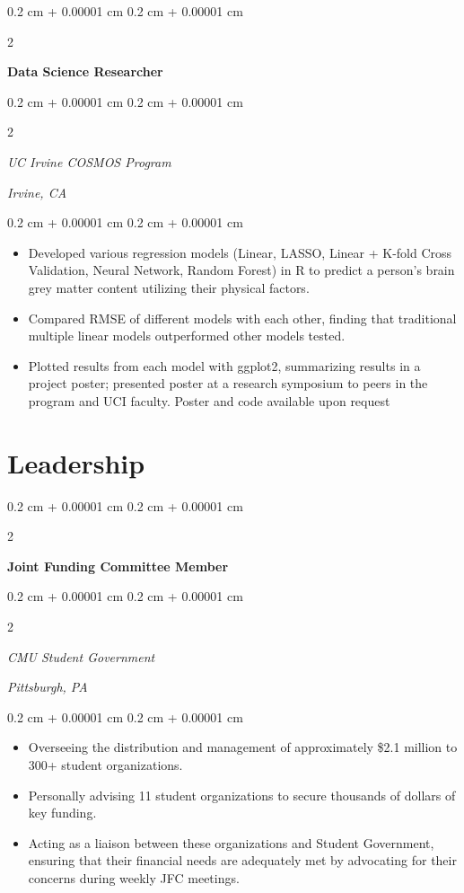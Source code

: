 \documentclass[10pt, letterpaper]{article}
\newenvironment{highlights}{
    \begin{itemize}[
        topsep=0.10 cm,
        parsep=0.10 cm,
        partopsep=0pt,
        itemsep=0pt,
        leftmargin=0.4 cm + 10pt
    ]
}{
    \end{itemize}
} %
\newenvironment{onecolentry}{
    \begin{adjustwidth}{
        0.2 cm + 0.00001 cm
    }{
        0.2 cm + 0.00001 cm
    }
}{
    \end{adjustwidth}
} %
\newenvironment{twocolentry}[2][]{
    \onecolentry
    \def\secondColumn{#2}
    \setcolumnwidth{\fill, 4.5 cm}
    \begin{paracol}{2}
}{
    \switchcolumn \raggedleft \secondColumn
    \end{paracol}
    \endonecolentry
} %
\begin{document}
        \vspace{0.2 cm}
        
        \begin{twocolentry}{
        }
            \textbf{Data Science Researcher}
        \end{twocolentry}
        \begin{twocolentry}{
            \textit{Irvine, CA}}
            \textit{UC Irvine COSMOS Program}
        \end{twocolentry}

        \vspace{0.10 cm}
        \begin{onecolentry}
            \begin{highlights}
                \item Developed various regression models (Linear, LASSO, Linear + K-fold Cross Validation, Neural Network, Random Forest) in R to predict a person's brain grey matter content utilizing their physical factors. 
                \item Compared RMSE of different models with each other, finding that traditional multiple linear models outperformed other models tested.
                \item Plotted results from each model with ggplot2, summarizing results in a project poster; presented poster at a research symposium to peers in the program and UCI faculty.  Poster and code available upon request
            \end{highlights}
        \end{onecolentry}

    \section{Leadership}
        \begin{twocolentry}{
            }
            \textbf{Joint Funding Committee Member}
        \end{twocolentry}
        \begin{twocolentry}{
            \textit{Pittsburgh, PA}}
            \textit{CMU Student Government}
        \end{twocolentry}

        \vspace{0.10 cm}
        \begin{onecolentry}
            \begin{highlights}
                \item Overseeing the distribution and management of approximately \$2.1 million to 300+ student organizations.
                \item Personally advising 11 student organizations to secure thousands of dollars of key funding.
                \item Acting as a liaison between these organizations and Student Government, ensuring that their financial needs are adequately met by advocating for their concerns during weekly JFC meetings.
            \end{highlights}
        \end{onecolentry}
\end{document}
